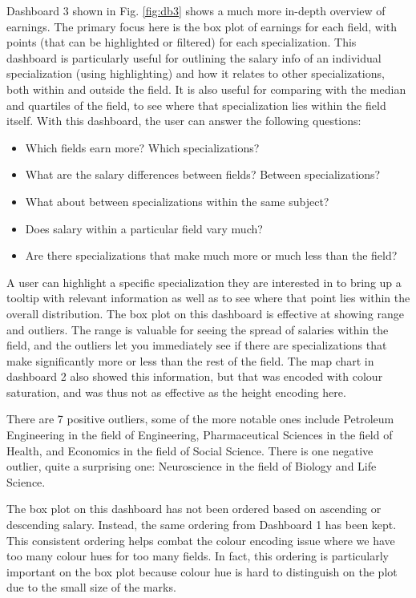 \documentclass[sigchi]{acmart}
\begin{document}
Dashboard 3 shown in Fig. \ref{fig:db3} shows a much more in-depth overview of earnings. The primary focus here is the box plot of earnings for each field, with points (that can be highlighted or filtered) for each specialization. This dashboard is particularly useful for outlining the salary info of an individual specialization (using highlighting) and how it relates to other specializations, both within and outside the field. It is also useful for comparing with the median and quartiles of the field, to see where that specialization lies within the field itself. With this dashboard, the user can answer the following questions:
\begin{itemize}
\item{Which fields earn more? Which specializations?}
\item{What are the salary differences between fields? Between specializations?}
\item{What about between specializations within the same subject?}
\item{Does salary within a particular field vary much?}
\item{Are there specializations that make much more or much less than the field?}
\end{itemize}
A user can highlight a specific specialization they are interested in to bring up a tooltip with relevant information as well as to see where that point lies within the overall distribution. The box plot on this dashboard is effective at showing range and outliers. The range is valuable for seeing the spread of salaries within the field, and the outliers let you immediately see if there are specializations that make significantly more or less than the rest of the field. The map chart in dashboard 2 also showed this information, but that was encoded with colour saturation, and was thus not as effective as the height encoding here.

There are 7 positive outliers, some of the more notable ones include Petroleum Engineering in the field of Engineering, Pharmaceutical Sciences in the field of Health, and Economics in the field of Social Science. There is one negative outlier, quite a surprising one: Neuroscience in the field of Biology and Life Science.

The box plot on this dashboard has not been ordered based on ascending or descending salary. Instead, the same ordering from Dashboard 1 has been kept. This consistent ordering helps combat the colour encoding issue where we have too many colour hues for too many fields. In fact, this ordering is particularly important on the box plot because colour hue is hard to distinguish on the plot due to the small size of the marks.
\end{document}
